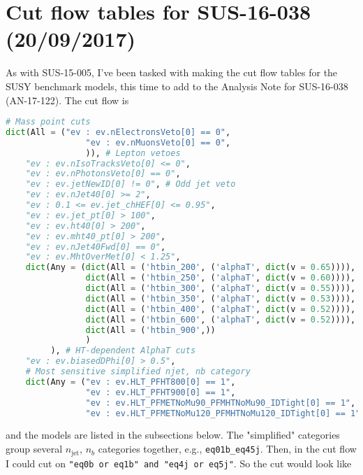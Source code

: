 \newpage
\chapter{Cut flow tables for SUS-16-038 (20/09/2017)}
\label{sec:cutflowtables2016paper}

As with SUS-15-005, I've been tasked with making the cut flow tables for the SUSY benchmark models, this time to add to the Analysis Note for SUS-16-038 (AN-17-122). The cut flow is

\begin{lstlisting}[belowskip=-0.7cm, language=python]
# Mass point cuts
dict(All = ("ev : ev.nElectronsVeto[0] == 0",
                "ev : ev.nMuonsVeto[0] == 0",
                )), # Lepton vetoes                                                                                                                        
    "ev : ev.nIsoTracksVeto[0] <= 0",
    "ev : ev.nPhotonsVeto[0] == 0",
    "ev : ev.jetNewID[0] != 0", # Odd jet veto 
    "ev : ev.nJet40[0] >= 2",
    "ev : 0.1 <= ev.jet_chHEF[0] <= 0.95",
    "ev : ev.jet_pt[0] > 100",
    "ev : ev.ht40[0] > 200",
    "ev : ev.mht40_pt[0] > 200",
    "ev : ev.nJet40Fwd[0] == 0",
    "ev : ev.MhtOverMet[0] < 1.25",
    dict(Any = (dict(All = ('htbin_200', ('alphaT', dict(v = 0.65)))),
                dict(All = ('htbin_250', ('alphaT', dict(v = 0.60)))),
                dict(All = ('htbin_300', ('alphaT', dict(v = 0.55)))),
                dict(All = ('htbin_350', ('alphaT', dict(v = 0.53)))),
                dict(All = ('htbin_400', ('alphaT', dict(v = 0.52)))),
                dict(All = ('htbin_600', ('alphaT', dict(v = 0.52)))),
                dict(All = ('htbin_900',))
                )
         ), # HT-dependent AlphaT cuts                                                                                                                     
    "ev : ev.biasedDPhi[0] > 0.5",
    # Most sensitive simplified njet, nb category
    dict(Any = ("ev : ev.HLT_PFHT800[0] == 1",
                "ev : ev.HLT_PFHT900[0] == 1",
                "ev : ev.HLT_PFMETNoMu90_PFMHTNoMu90_IDTight[0] == 1",
                "ev : ev.HLT_PFMETNoMu120_PFMHTNoMu120_IDTight[0] == 1")), # HLTs, needed only for LLP models
\end{lstlisting}

and the models are listed in the subsections below. The "simplified" categories group several $n_{\mathrm{jet}}$, $n_b$ categories together, e.g., \texttt{eq01b\_eq45j}. Then, in the cut flow I could cut on \texttt{"eq0b or eq1b" and "eq4j or eq5j"}. So the cut would look like

